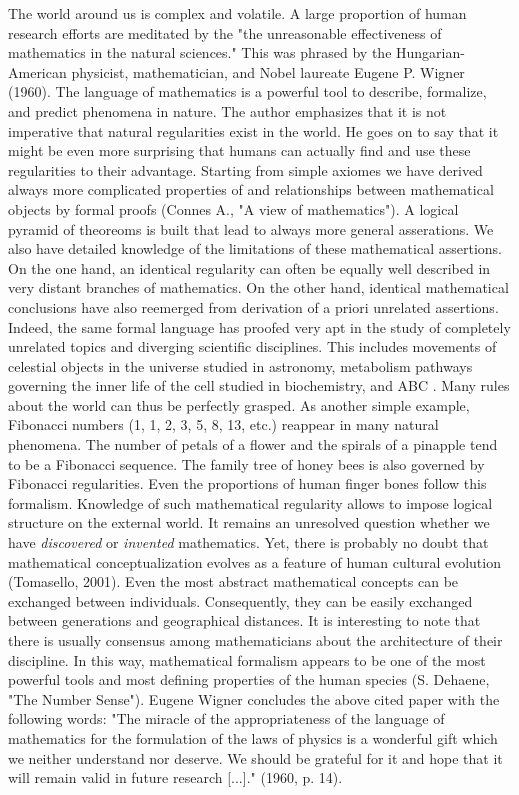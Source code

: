 \documentclass[authoryear,review,3p]{elsarticle}
\begin{document}
The world around us is complex and volatile.
%
A large proportion of human research efforts are meditated by the 
"the unreasonable effectiveness of mathematics in the natural sciences."
This was phrased by the Hungarian-American
physicist, mathematician, and Nobel laureate Eugene P. Wigner (1960).
The language of mathematics is a powerful tool to
describe, formalize, and predict phenomena in nature.
The author emphasizes that it is not imperative that
natural regularities exist in the world. He goes on to
say that it might be even more surprising that humans can actually
find and use these regularities to their advantage.
%
Starting from simple axiomes we have derived always more complicated
properties of and relationships between mathematical objects by formal proofs
(Connes A., "A view of mathematics").
A logical pyramid of theoreoms is built that lead to always
more general asserations.
We also have detailed knowledge of the limitations of these mathematical
assertions.
%
On the one hand,
an identical regularity can often be equally well described in very distant
branches of mathematics.
On the other hand,
identical mathematical conclusions have also reemerged from derivation of
a priori unrelated assertions.
%
Indeed, the same formal language has proofed very apt in
the study of completely unrelated topics and diverging scientific disciplines.
This includes movements of celestial objects in the universe studied in astronomy,
metabolism pathways governing the inner life of the cell studied in biochemistry,
and
ABC
.
%
Many rules about the world can thus be perfectly grasped.
As another simple example,
Fibonacci numbers (1, 1, 2, 3, 5, 8, 13, etc.)
reappear in many natural phenomena.
The number of petals of a flower and the spirals of a pinapple tend
to be a Fibonacci sequence.
The family tree of honey bees is also governed by Fibonacci regularities.
Even the proportions of human finger bones follow this formalism.
Knowledge of such mathematical regularity 
allows to impose logical structure on the external world.
%
It remains an unresolved question whether we have
\textit{discovered} or \textit{invented} mathematics.
Yet, there is probably no doubt
that mathematical conceptualization
evolves as a feature of human cultural evolution (Tomasello, 2001).
Even the most abstract mathematical concepts can
be exchanged between individuals. Consequently,
they can be easily exchanged between generations and geographical distances.
It is interesting to note that there is usually consensus among mathematicians
about the architecture of their discipline.
In this way, mathematical formalism
appears to be one of the most
powerful tools and most defining properties of the human species
(S. Dehaene, "The Number Sense").
Eugene Wigner concludes the above cited paper with the following words:
"The miracle of the appropriateness of the language of mathematics
for the formulation of the laws of physics is a wonderful gift
which we neither understand nor deserve. We should be grateful for
it and hope that it will remain valid in future research [...]."
(1960, p. 14).
\end{document}
